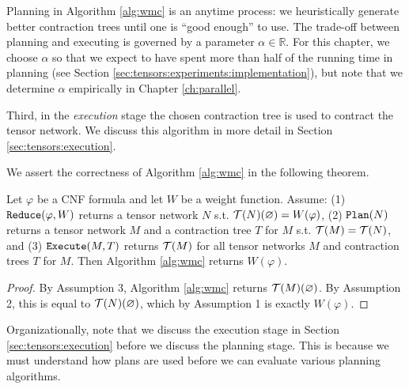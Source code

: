 Planning in Algorithm \ref{alg:wmc} is an anytime process: we heuristically generate better contraction trees until one is ``good enough'' to use. The trade-off between planning and executing is governed by a parameter $\alpha \in \mathbb{R}$. 
For this chapter, we choose $\alpha$ so that we expect to have spent more than half of the running time in planning (see Section \ref{sec:tensors:experiments:implementation}), but note that we determine $\alpha$ empirically in Chapter \ref{ch:parallel}.

Third, in the \emph{execution} stage the chosen contraction tree is used to contract the tensor network. We discuss this algorithm in more detail in Section \ref{sec:tensors:execution}.

We assert the correctness of Algorithm \ref{alg:wmc} in the following theorem.
\begin{theorem}
\label{thm:alg-correctness}
Let $\varphi$ be a CNF formula and let $W$ be a weight function. 
    Assume:
    (1) $\texttt{\upshape Reduce}(\varphi, W)$ returns a tensor network $N$ s.t. $\mathcal{T}(N)(\varnothing) = W(\varphi)$,
    (2) $\texttt{\upshape Plan}(N)$ returns a tensor network $M$ and a contraction tree $T$ for $M$ s.t. $\mathcal{T}(M) = \mathcal{T}(N)$, and
    (3) $\texttt{\upshape Execute}(M, T)$ returns $\mathcal{T}(M)$ for all tensor networks $M$ and contraction trees $T$ for $M$.
Then Algorithm \ref{alg:wmc} returns $W(\varphi)$.
\end{theorem}
\begin{proof}
By Assumption 3, Algorithm \ref{alg:wmc} returns $\mathcal{T}(M)(\varnothing)$. 
By Assumption 2, this is equal to $\mathcal{T}(N)(\varnothing)$, which by Assumption 1 is exactly $W(\varphi)$.
\end{proof}

Organizationally, note that we discuss the execution stage in Section \ref{sec:tensors:execution} before we discuss the planning stage. 
This is because we must understand how plans are used before we can evaluate various planning algorithms.

